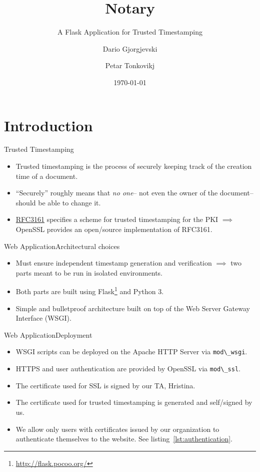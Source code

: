 \documentclass[xcolor={svgnames, table}, usepdftitle=false]{beamer}
\title{Notary}
\subtitle{A Flask Application for Trusted Timestamping}
\author[Dario Gj.\ \& Petar T.]{%
  Dario Gjorgjevski\inst{1} \and Petar Tonkovikj\inst{1}
}
\institute[FCSE]{%
  \inst{1}Faculty of Computer Science and Engineering\\%
  Ss.\ Cyril and Methodius University in Skopje
}
\date{\today}
\begin{document}
\begin{frame}
  \titlepage{}
\end{frame}

\section{Introduction}

\begin{frame}{Trusted Timestamping}
  \begin{itemize}
  \item Trusted timestamping is the process of securely keeping track
    of the creation time of a document.
  \item \enquote{Securely} roughly means that \emph{no one}\--- not
    even the owner of the document\--- should be able to change it.
  \item \href{https://tools.ietf.org/html/rfc3161}{RFC3161} specifies
    a scheme for trusted timestamping for the PKI \(\implies\) OpenSSL
    provides an open\-/source implementation of RFC3161.
  \end{itemize}
\end{frame}

\begin{frame}{Web Application}{Architectural choices}
  \begin{itemize}
  \item Must ensure independent timestamp generation and verification
    \(\implies\) two parts meant to be run in isolated environments.
  \item Both parts are built using
    Flask\footnote{\url{http://flask.pocoo.org/}} and Python 3.
  \item Simple and bulletproof architecture built on top of the Web
    Server Gateway Interface (WSGI).
  \end{itemize}
\end{frame}

\begin{frame}{Web Application}{Deployment}
  \begin{itemize}
  \item WSGI scripts can be deployed on the Apache HTTP Server via
    \Verb+mod\_wsgi+.
  \item HTTPS and user authentication are provided by OpenSSL via
    \Verb+mod\_ssl+.
  \item The certificate used for SSL is signed by our TA, Hristina.
  \item The certificate used for trusted timestamping is generated and
    self\-/signed by us.
  \item We allow only users with certificates issued by our
    organization to authenticate themselves to the website.  See
    listing~\ref{lst:authentication}.
  \end{itemize}
\end{frame}
\end{document}
